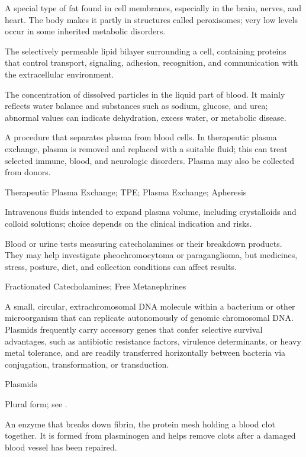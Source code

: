  A special type of fat found in cell membranes, especially in the brain, nerves, and heart. The body makes it partly in structures called peroxisomes; very low levels occur in some inherited metabolic disorders.

 The selectively permeable lipid bilayer surrounding a cell, containing proteins that control transport, signaling, adhesion, recognition, and communication with the extracellular environment.

 The concentration of dissolved particles in the liquid part of blood. It mainly reflects water balance and substances such as sodium, glucose, and urea; abnormal values can indicate dehydration, excess water, or metabolic disease.

 A procedure that separates plasma from blood cells. In therapeutic plasma exchange, plasma is removed and replaced with a suitable fluid; this can treat selected immune, blood, and neurologic disorders. Plasma may also be collected from donors.

\synonyms
Therapeutic Plasma Exchange; TPE; Plasma Exchange; Apheresis

 Intravenous fluids intended to expand plasma volume, including crystalloids and colloid solutions; choice depends on the clinical indication and risks.

 Blood or urine tests measuring catecholamines or their breakdown products. They may help investigate pheochromocytoma or paraganglioma, but medicines, stress, posture, diet, and collection conditions can affect results.

\synonyms
Fractionated Catecholamines; Free Metanephrines

 A small, circular, extrachromosomal DNA molecule within a bacterium or other microorganism that can replicate autonomously of genomic chromosomal DNA. Plasmids frequently carry accessory genes that confer selective survival advantages, such as antibiotic resistance factors, virulence determinants, or heavy metal tolerance, and are readily transferred horizontally between bacteria via conjugation, transformation, or transduction.

\synonyms
Plasmids

 Plural form; see .

 An enzyme that breaks down fibrin, the protein mesh holding a blood clot together. It is formed from plasminogen and helps remove clots after a damaged blood vessel has been repaired.


